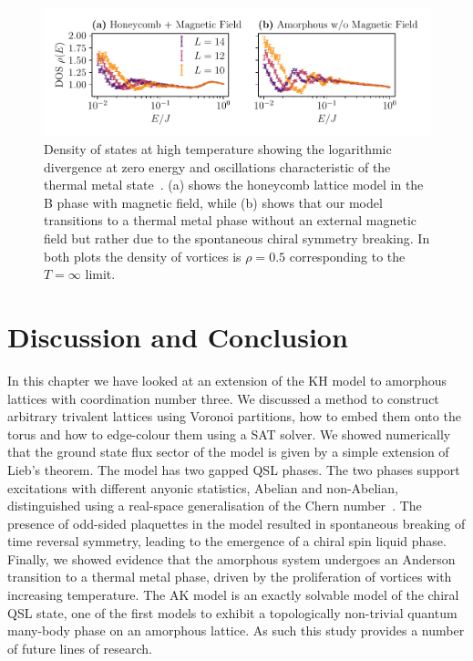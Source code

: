 \hypertarget{fig:DOS_oscillations}{%
\begin{figure}
\centering
\includegraphics[width=1\textwidth,height=\textheight]{figure_code/amk_chapter/results/DOS_oscillations/DOS_oscillations}
\caption[{Distinctive Oscillations in the Density of States}]{Density of states at high temperature showing the logarithmic divergence at zero energy and oscillations characteristic of the thermal metal state~\autocite{bocquet_disordered_2000,selfThermallyInducedMetallic2019}. (a) shows the honeycomb lattice model in the B phase with magnetic field, while (b) shows that our model transitions to a thermal metal phase without an external magnetic field but rather due to the spontaneous chiral symmetry breaking. In both plots the density of vortices is \(\rho = 0.5\) corresponding to the \(T = \infty\) limit.}
\label{fig:DOS_oscillations}
\end{figure}
}

\hypertarget{sec:AMK-Conclusion}{%
\section{Discussion and Conclusion}\label{sec:AMK-Conclusion}}

In this chapter we have looked at an extension of the KH model to amorphous lattices with coordination number three. We discussed a method to construct arbitrary trivalent lattices using Voronoi partitions, how to embed them onto the torus and how to edge-colour them using a SAT solver. We showed numerically that the ground state flux sector of the model is given by a simple extension of Lieb's theorem. The model has two gapped QSL phases. The two phases support excitations with different anyonic statistics, Abelian and non-Abelian, distinguished using a real-space generalisation of the Chern number~\autocite{peru_preprint}. The presence of odd-sided plaquettes in the model resulted in spontaneous breaking of time reversal symmetry, leading to the emergence of a chiral spin liquid phase. Finally, we showed evidence that the amorphous system undergoes an Anderson transition to a thermal metal phase, driven by the proliferation of vortices with increasing temperature. The AK model is an exactly solvable model of the chiral QSL state, one of the first models to exhibit a topologically non-trivial quantum many-body phase on an amorphous lattice. As such this study provides a number of future lines of research.

